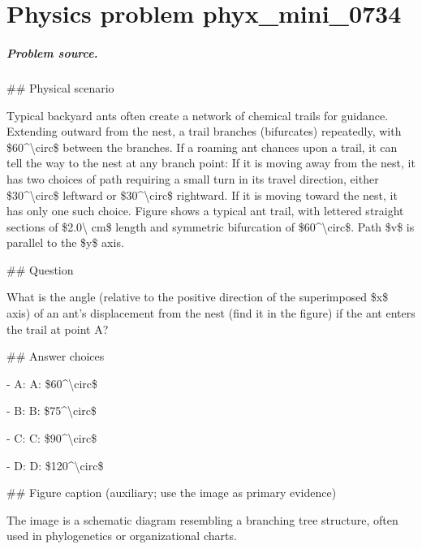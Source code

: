 
\chapter{Physics problem phyx\_mini\_0734}
\label{ch:PhyXMiniProblems_problem_phyx_mini_0734}

\paragraph{Problem source.}
\#\# Physical scenario

Typical backyard ants often create a network of chemical trails for guidance. Extending outward from the nest, a trail branches (bifurcates) repeatedly, with \$60\textasciicircum{}\textbackslash{}circ\$ between the branches. If a roaming ant chances upon a trail, it can tell the way to the nest at any branch point: If it is moving away from the nest, it has two choices of path requiring a small turn in its travel direction, either \$30\textasciicircum{}\textbackslash{}circ\$ leftward or \$30\textasciicircum{}\textbackslash{}circ\$ rightward. If it is moving toward the nest, it has only one such choice. Figure shows a typical ant trail, with lettered straight sections of \$2.0\textbackslash{} cm\$ length and symmetric bifurcation of \$60\textasciicircum{}\textbackslash{}circ\$. Path \$v\$ is parallel to the \$y\$ axis.

\#\# Question

What is the angle (relative to the positive direction of the superimposed \$x\$ axis) of an ant's displacement from the nest (find it in the figure) if the ant enters the trail at point A?

\#\# Answer choices

- A: A: \$60\textasciicircum{}\textbackslash{}circ\$

- B: B: \$75\textasciicircum{}\textbackslash{}circ\$

- C: C: \$90\textasciicircum{}\textbackslash{}circ\$

- D: D: \$120\textasciicircum{}\textbackslash{}circ\$

\#\# Figure caption (auxiliary; use the image as primary evidence)

The image is a schematic diagram resembling a branching tree structure, often used in phylogenetics or organizational charts. 

